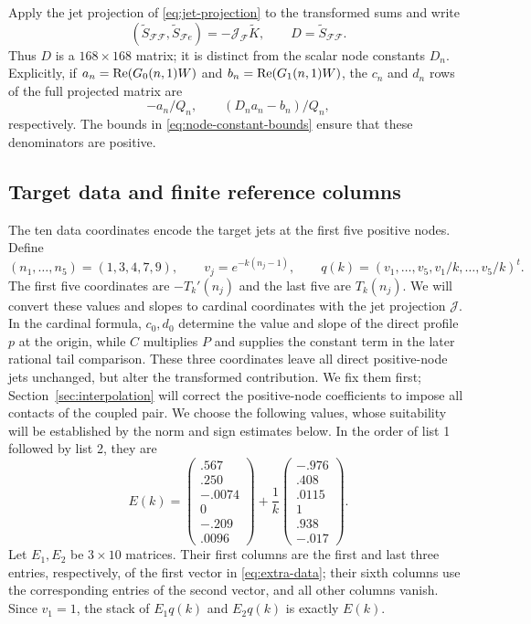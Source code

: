 Apply the jet projection of \eqref{eq:jet-projection} to the transformed
sums and write
\[
 (\widetilde S_{\mathcal F\mathcal F},\widetilde S_{\mathcal F e})
 =-\mathcal J_{\mathcal F}\widetilde K,
 \qquad D=\widetilde S_{\mathcal F\mathcal F}.
\]
Thus $D$ is a $168\times168$ matrix; it is distinct from the scalar node
constants $D_n$.  Explicitly, if
$a_n=\operatorname{Re}(G_0(n,1)W)$ and $b_n=\operatorname{Re}(G_1(n,1)W)$, the $c_n$ and $d_n$
rows of the full projected matrix are
\[
 -a_n/Q_n,\qquad (D_na_n-b_n)/Q_n,
\]
respectively.  The bounds in \eqref{eq:node-constant-bounds} ensure that
these denominators are positive.

\subsection{Target data and finite reference columns}

The ten data coordinates encode the target jets at the first five positive
nodes.  Define
\[
 (n_1,\ldots,n_5)=(1,3,4,7,9),\qquad
 v_j=e^{-k(n_j-1)},\qquad
 q(k)=(v_1,\ldots,v_5,v_1/k,\ldots,v_5/k)^t.
\]
The first five coordinates are $-T_k'(n_j)$ and the last five are
$T_k(n_j)$.  We will convert these values and slopes to cardinal coordinates
with the jet projection $\mathcal J$.
In the cardinal formula, $c_0,d_0$ determine the value and slope of the direct
profile $p$ at the origin, while $C$ multiplies $P$ and supplies the constant
term in the later rational tail comparison.  These three coordinates leave
all direct positive-node jets unchanged, but alter the transformed
contribution.  We fix them first; Section~\ref{sec:interpolation} will correct
the positive-node coefficients to impose all contacts of the coupled pair.
We choose the following values, whose suitability will be established by the
norm and sign estimates below.  In the order of list 1 followed by list 2,
they are
\begin{equation}\label{eq:extra-data}
 E(k)=
 \begin{pmatrix}.567\\.250\\-.0074\\0\\-.209\\.0096\end{pmatrix}
 +\frac1k
 \begin{pmatrix}-.976\\.408\\.0115\\1\\.938\\-.017\end{pmatrix}.
\end{equation}
Let $E_1,E_2$ be $3\times10$ matrices.  Their first columns are the first
and last three entries, respectively, of the first vector in
\eqref{eq:extra-data}; their sixth columns use the corresponding entries of
the second vector, and all other columns vanish.  Since $v_1=1$, the stack
of $E_1q(k)$ and $E_2q(k)$ is exactly $E(k)$.

